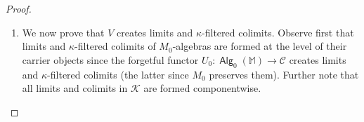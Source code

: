 \documentclass[sigconf,
			final%
			nonacm
                        ]{acmart}
\numberwithin{equation}{section}
\numberwithin{equation}{section}
\theoremstyle{plain}
\theoremstyle{definition}
\newcommand{\id}{\mathsf{id}}
\newcommand{\M}{\mathbb{M}}                   %
\newcommand{\CatC}{\mathscr{C}}           %
\newcommand{\CatK}{\mathscr{K}}
\DeclareMathOperator{\Alg}{\mathsf{Alg}}
\begin{document}
\begin{proof}
\begin{enumerate}
    \[
      \begin{tikzcd}
        M_1B_0 \ar{r}{b^{1,0}} \ar{d}[swap]{M_1 h_0^{-1}}
        \ar[shiftarr = {xshift=-30}]{dd}[swap]{M_1\id}
        &
        B_1
        \ar{d}{h_1^{-1}}
        \ar[shiftarr = {xshift=20}]{dd}{\id}
        \\
        M_1A_0 \ar{r}{a^{1,0}} \ar{d}[swap]{M_1 h_0}
        &
        A_1
        \ar{d}{h_1}
        \\
        M_1B_0 \ar{r}{b^{1,0}}
        &
        B_1
      \end{tikzcd}
    \]
    Indeed, the outside, left- and right-hand parts and the lower
    square commute. Thus so does the desired upper square when
    postcomposed by the isomorphism $h_1$. Thus, this square
    commutes.

  \item We now prove that $V$ creates limits and $\kappa$-filtered
    colimits. Observe first that limits and $\kappa$-filtered colimits
    of $M_0$-algebras are formed at the level of their carrier objects
    since the forgetful functor $U_0\colon \Alg_0(\M) \to \CatC$
    creates limits and $\kappa$-filtered colimits (the latter since
    $M_0$ preserves them). Further note that all limits and colimits
    in $\CatK$ are formed componentwise.%


\end{enumerate}
\end{proof}
\end{document}
